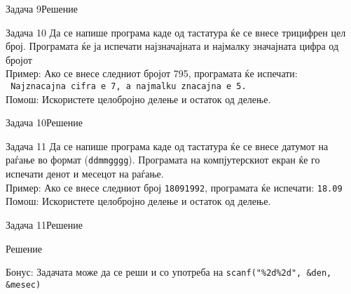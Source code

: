 \begin{frame}[fragile]{Задача 9}{Решение}
	
\end{frame}


\begin{frame}[fragile]{Задача 10}
Да се напише програма каде од тастатура ќе се внесе трицифрен цел број. Програмата ќе ја испечати најзначајната и најмалку значајната цифра од бројот\\
Пример: Ако се внесе следниот бројот 795, програмата ќе испечати:\\
\texttt{	Najznacajna cifra e 7, a najmalku znacajna e 5.}\\
Помош: Искористете целобројно делење и остаток од делење.
\end{frame}

\begin{frame}[fragile]{Задача 10}{Решение}

\end{frame}


\begin{frame}[fragile]{Задача 11}
Да се напише програма каде од тастатура ќе се внесе датумот на раѓање во формат (\texttt{ddmmgggg}). Програмата на компјутерскиот екран ќе го испечати денот и месецот на раѓање.\\
Пример: Ако се внесе следниот број \texttt{18091992}, програмата ќе испечати: \texttt{18.09}\\
Помош: Искористете целобројно делење и остаток од делење.
\end{frame}

\begin{frame}[fragile]{Задача 11}{Решение}
	\begin{exampleblock}{Решение}
		
	\end{exampleblock}
	Бонус: Задачата може да се реши и со употреба на \texttt{scanf("\%2d\%2d", \&den, \&mesec)}
\end{frame}
